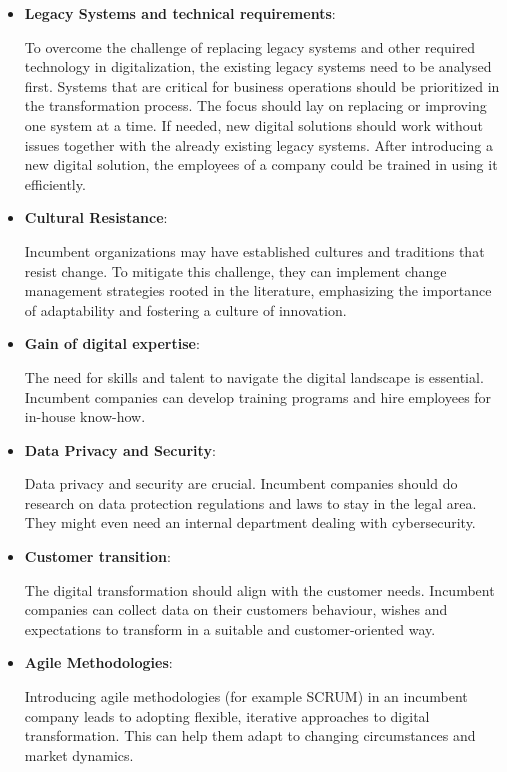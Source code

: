 \documentclass[a4]{scrartcl}
\begin{document}
\begin{itemize}
	
	\item \textbf{Legacy Systems and technical requirements}: 
	
	To overcome the challenge of replacing legacy systems and other required technology in digitalization, the existing legacy systems need to be analysed first. Systems that are critical for business operations should be prioritized in the transformation process. The focus should lay on replacing or improving one system at a time. 	
	If needed, new digital solutions should work without issues together with the already existing legacy systems. After introducing a new digital solution, the employees of a company could be trained in using it efficiently.~\cite{legacy, wiwi}
	
	
	
	
	\item \textbf{Cultural Resistance}: 
	
	Incumbent organizations may have established cultures and traditions that resist change. To mitigate this challenge, they can implement change management strategies rooted in the literature, emphasizing the importance of adaptability and fostering a culture of innovation.~\cite{acceptance, wiwi}
	
	
	\item \textbf{Gain of digital expertise}: 
	
	The need for skills and talent to navigate the digital landscape is essential. Incumbent companies can develop training programs and hire employees for in-house know-how.~\cite{digitalmatrix, leadingdigital, wiwi}
	
	
	\item \textbf{Data Privacy and Security}: 
	
	Data privacy and security are crucial. Incumbent companies should do research on data protection regulations and laws to stay in the legal area. They might even need an internal department dealing with cybersecurity.~\cite{digitalmatrix, wiwi}
	
	
	\item \textbf{Customer transition}: 
	
	The digital transformation should align with the customer needs. Incumbent companies can collect data on their customers behaviour, wishes and expectations to transform in a suitable and customer-oriented way.~\cite{wiwi}
	
	
	\item \textbf{Agile Methodologies}: 
	
	Introducing agile methodologies (for example SCRUM) in an incumbent company leads to adopting flexible, iterative approaches to digital transformation. This can help them adapt to changing circumstances and market dynamics.~\cite{wiwi, agile}
	

	
\end{itemize}
\end{document}
